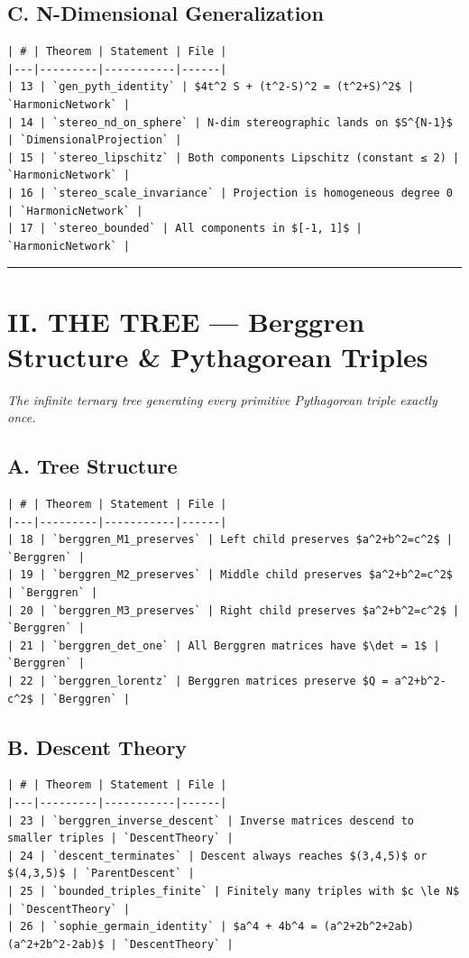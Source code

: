 \documentclass[12pt,a4paper,openany]{book}
\begin{document}
\subsection{C. N-Dimensional Generalization}

\begin{verbatim}
| # | Theorem | Statement | File |
|---|---------|-----------|------|
| 13 | `gen_pyth_identity` | $4t^2 S + (t^2-S)^2 = (t^2+S)^2$ | `HarmonicNetwork` |
| 14 | `stereo_nd_on_sphere` | N-dim stereographic lands on $S^{N-1}$ | `DimensionalProjection` |
| 15 | `stereo_lipschitz` | Both components Lipschitz (constant ≤ 2) | `HarmonicNetwork` |
| 16 | `stereo_scale_invariance` | Projection is homogeneous degree 0 | `HarmonicNetwork` |
| 17 | `stereo_bounded` | All components in $[-1, 1]$ | `HarmonicNetwork` |
\end{verbatim}

\bigskip\hrule\bigskip

\section{II. THE TREE — Berggren Structure \& Pythagorean Triples}

\textit{The infinite ternary tree generating every primitive Pythagorean triple exactly once.}

\subsection{A. Tree Structure}

\begin{verbatim}
| # | Theorem | Statement | File |
|---|---------|-----------|------|
| 18 | `berggren_M1_preserves` | Left child preserves $a^2+b^2=c^2$ | `Berggren` |
| 19 | `berggren_M2_preserves` | Middle child preserves $a^2+b^2=c^2$ | `Berggren` |
| 20 | `berggren_M3_preserves` | Right child preserves $a^2+b^2=c^2$ | `Berggren` |
| 21 | `berggren_det_one` | All Berggren matrices have $\det = 1$ | `Berggren` |
| 22 | `berggren_lorentz` | Berggren matrices preserve $Q = a^2+b^2-c^2$ | `Berggren` |
\end{verbatim}

\subsection{B. Descent Theory}

\begin{verbatim}
| # | Theorem | Statement | File |
|---|---------|-----------|------|
| 23 | `berggren_inverse_descent` | Inverse matrices descend to smaller triples | `DescentTheory` |
| 24 | `descent_terminates` | Descent always reaches $(3,4,5)$ or $(4,3,5)$ | `ParentDescent` |
| 25 | `bounded_triples_finite` | Finitely many triples with $c \le N$ | `DescentTheory` |
| 26 | `sophie_germain_identity` | $a^4 + 4b^4 = (a^2+2b^2+2ab)(a^2+2b^2-2ab)$ | `DescentTheory` |
\end{verbatim}
\end{document}

